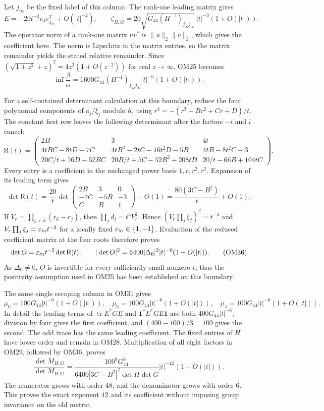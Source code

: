 \documentclass[11pt]{article}
\newcommand{\C}{\mathbb C}
\newcommand{\tr}{\operatorname{tr}}
\newcommand{\eps}{\varepsilon}
\newcommand{\one}{\mathbf 1}
\begin{document}
Let $j_\infty$ be the fixed label of this column.
The rank-one leading matrix gives
\[
E=-20t^{-3}e_4e_{j_\infty}^T+O(|t|^{-2}),\qquad
\zeta_{H,G}
=20\sqrt{G_{44}(H^{-1})_{j_\infty j_\infty}}\,
 |t|^{-3}(1+O(|t|)).
\tag{OM32}
\]
The operator norm of a rank-one matrix $uv^*$ is
$\|u\|_2\|v\|_2$, which gives the coefficient here.
The norm is Lipschitz in the matrix entries, so the matrix
remainder yields the stated relative remainder.  Since
$(\sqrt{1+z^2}+z)^2=4z^2(1+O(z^{-2}))$ for real $z\to\infty$,
OM25 becomes
\[
\boxed{\inf\frac{\beta}{\alpha}
=1600G_{44}(H^{-1})_{j_\infty j_\infty}
 |t|^{-6}(1+O(|t|)).}
\tag{OM33}
\]

For a self-contained determinant calculation at this boundary,
reduce the four polynomial components of $o_j/\xi_j$ modulo
$h$, using $r^4=-(r^3+Br^2+Cr+D)/t$.
The constant first row leaves the following determinant after
the factors $-i$ and $i$ cancel:
\[
\mathsf R(t)=\begin{pmatrix}
2B&3&4t\\
4tBC-8tD-7C&4tB^2-2tC-16t^2D-5B&4tB-8t^2C-3\\
20C/t+76D-52BC&20B/t+5C-52B^2+208tD&20/t-66B+104tC
\end{pmatrix}.
\tag{OM34}
\]
Every entry is a coefficient in the unchanged power basis
$1,r,r^2,r^3$.  Expansion of its leading term gives
\[
\det\mathsf R(t)
=\frac{20}{t}
\det\begin{pmatrix}2B&3&0\\-7C&-5B&-3\\C&B&1\end{pmatrix}
 +O(1)
=\frac{80(3C-B^2)}t+O(1).
\tag{OM35}
\]
If $V_r=\prod_{j<k}(r_k-r_j)$, then
$\prod_jd_j=t^4V_r^2$.  Hence
$(V_r\prod_j\xi_j)^2=t^{-4}$ and
$V_r\prod_j\xi_j=\eps_{\rm br}t^{-2}$ for a locally fixed
$\eps_{\rm br}\in\{1,-1\}$.  Evaluation of the reduced
coefficient matrix at the four roots therefore proves
\[
\det O=\eps_{\rm br}t^{-2}\det\mathsf R(t),\qquad
|\det O|^2=6400|\Delta_0|^2|t|^{-6}(1+O(|t|)).
\tag{OM36}
\]
As $\Delta_0\ne0$, $O$ is invertible for every sufficiently small
nonzero $t$; thus the positivity assumption used in OM25 has
been established on this boundary.

The same single escaping column in OM31 gives
\[
\mu_0=100G_{44}|t|^{-6}(1+O(|t|)),\quad
\mu_3=100G_{44}|t|^{-6}(1+O(|t|)),\quad
\mu_4=100G_{44}|t|^{-6}(1+O(|t|)).
\tag{OM37}
\]
In detail the leading terms of $\tr E^*GE$ and
$\one^*E^*GE\one$ are both $400G_{44}|t|^{-6}$;
division by four gives the first coefficient, and
$(400-100)/3=100$ gives the second.
The odd trace has the same leading coefficient.  The fixed
entries of $H$ have lower order and remain in OM28.
Multiplication of all eight factors in OM29, followed by OM36,
proves
\[
\boxed{\frac{\det\overline M_{H,G}}{\det M_{H,G}}
=\frac{100^8G_{44}^8}
 {6400|3C-B^2|^2\det H\det G}
 |t|^{-42}(1+O(|t|)).}
\tag{OM38}
\]
The numerator grows with order $48$, and the denominator grows
with order $6$.  This proves the exact exponent $42$ and its
coefficient without imposing group invariance on the old metric.
\end{document}
